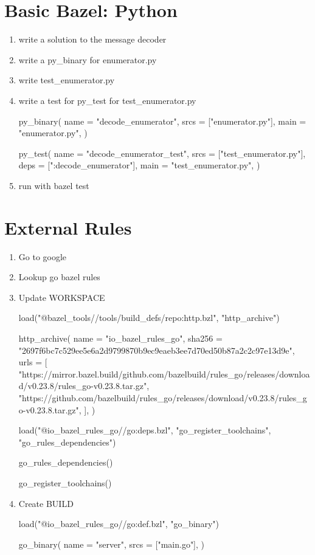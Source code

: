 \documentclass{article}
\begin{document}
\section{Basic Bazel: Python}
\begin{enumerate}
    \item write a solution to the message decoder
    \item write a py\_binary for enumerator.py
    \item write test\_enumerator.py
    \item write a test for py\_test for test\_enumerator.py
\begin{bazel}
py_binary(
    name = "decode_enumerator",
    srcs = ["enumerator.py"],
    main = "enumerator.py",
)

py_test(
    name = "decode_enumerator_test",
    srcs = ["test_enumerator.py"],
    deps = [":decode_enumerator"],
    main = "test_enumerator.py",
)
\end{bazel}
    \item run with bazel test
\end{enumerate}

\section{External Rules}
\begin{enumerate}
    \item Go to google
    \item Lookup go bazel rules
    \item Update WORKSPACE
\begin{bazel}
load("@bazel_tools//tools/build_defs/repo:http.bzl", "http_archive")

http_archive(
    name = "io_bazel_rules_go",
    sha256 = "2697f6bc7c529ee5e6a2d9799870b9ec9eaeb3ee7d70ed50b87a2c2c97e13d9e",
    urls = [
        "https://mirror.bazel.build/github.com/bazelbuild/rules_go/releases/download/v0.23.8/rules_go-v0.23.8.tar.gz",
        "https://github.com/bazelbuild/rules_go/releases/download/v0.23.8/rules_go-v0.23.8.tar.gz",
    ],
)

load("@io_bazel_rules_go//go:deps.bzl", "go_register_toolchains", "go_rules_dependencies")

go_rules_dependencies()

go_register_toolchains()
\end{bazel}
    \item Create BUILD
\begin{bazel}
load("@io_bazel_rules_go//go:def.bzl", "go_binary")

go_binary(
    name = "server",
    srcs = ["main.go"],
)
\end{bazel}
\end{enumerate}
\end{document}
